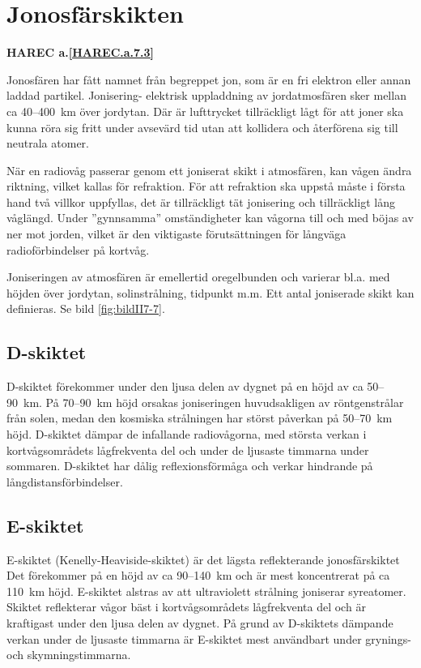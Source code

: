 \section{Jonosfärskikten}
\textbf{
HAREC a.\ref{HAREC.a.7.3}\label{myHAREC.a.7.3}
}

Jonosfären har fått namnet från begreppet jon, som är en fri elektron
eller annan laddad partikel. Jonisering- elektrisk uppladdning av
jordatmosfären sker mellan ca 40--400~km över jordytan. Där är
lufttrycket tillräckligt lågt för att joner ska kunna röra sig fritt
under avsevärd tid utan att kollidera och återförena sig till neutrala
atomer.

När en radiovåg passerar genom ett joniserat skikt i atmosfären,
kan vågen ändra riktning, vilket kallas för refraktion. För att
refraktion ska uppstå måste i första hand två villkor uppfyllas, det
är tillräckligt tät jonisering och tillräckligt lång våglängd. Under
''gynnsamma'' omständigheter kan vågorna till och med böjas av ner mot
jorden, vilket är den viktigaste förutsättningen för långväga
radioförbindelser på kortvåg.

Joniseringen av atmosfären är emellertid oregelbunden och varierar
bl.a. med höjden över jordytan, solinstrålning, tidpunkt m.m.  Ett
antal joniserade skikt kan definieras. Se bild \ref{fig:bildII7-7}.

\subsection{D-skiktet}

D-skiktet förekommer under den ljusa delen av dygnet på en höjd av ca
50--90~km. På 70--90~km höjd orsakas joniseringen huvudsakligen av
röntgenstrålar från solen, medan den kosmiska strålningen har störst
påverkan på 50--70~km höjd. D-skiktet dämpar de infallande
radiovågorna, med största verkan i kortvågsområdets lågfrekventa del
och under de ljusaste timmarna under sommaren. D-skiktet har dålig
reflexionsförmåga och verkar hindrande på långdistansförbindelser.

\subsection{E-skiktet}

E-skiktet (Kenelly-Heaviside-skiktet) är det lägsta reflekterande
jonosfärskiktet Det förekommer på en höjd av ca 90--140~km och är mest
koncentrerat på ca 110~km höjd. E-skiktet alstras av att ultraviolett
strålning joniserar syreatomer. Skiktet reflekterar vågor bäst i
kortvågsområdets lågfrekventa del och är kraftigast under den ljusa
delen av dygnet. På grund av D-skiktets dämpande verkan under de
ljusaste timmarna är E-skiktet mest användbart under grynings- och
skymningstimmarna.

